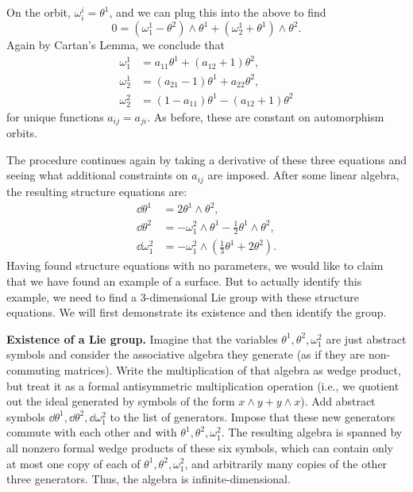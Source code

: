 On the orbit, $\omega^i_i=\theta^1$, and we can plug this into the above to find 
\[0=(\omega^1_1-\theta^2)\wedge\theta^1+(\omega^1_2+\theta^1)\wedge\theta^2.\]
Again by Cartan's Lemma, we conclude that 
\begin{align}
    \omega^1_1&=a_{11}\theta^1+(a_{12}+1)\theta^2,\\
    \omega^1_2&=(a_{21}-1)\theta^1+a_{22}\theta^2,\\
    \omega^2_2&=(1-a_{11})\theta^1-(a_{12}+1)\theta^2
\end{align}
for unique functions $a_{ij}=a_{ji}$. As before, these are constant on automorphism orbits.

The procedure continues again by taking a derivative of these three equations and seeing what additional constraints on $a_{ij}$ are imposed. After some linear algebra, the resulting structure equations are:
\begin{align}
    \dd\theta^1&=2\theta^1\wedge\theta^2,\\
    \dd\theta^2&=-\omega^2_1\wedge\theta^1-\frac12\theta^1\wedge\theta^2,\\
    \dd\omega^2_1&=-\omega^2_1\wedge\left(\frac13\theta^1+2\theta^2\right).
\end{align}
Having found structure equations with no parameters, we would like to claim that we have found an example of a surface. But to actually identify this example, we need to find a $3$-dimensional Lie group with these structure equations. We will first demonstrate its existence and then identify the group.

\textbf{Existence of a Lie group.} Imagine that the variables $\theta^1,\theta^2,\omega^2_1$ are just abstract symbols and consider the associative algebra they generate (as if they are non-commuting matrices). Write the multiplication of that algebra as wedge product, but treat it as a formal antisymmetric multiplication operation (i.e., we quotient out the ideal generated by symbols of the form $x\wedge y+y\wedge x$). Add abstract symbols $\dd\theta^1,\dd\theta^2,\dd\omega^2_1$ to the list of generators. Impose that these new generators commute with each other and with $\theta^1,\theta^2,\omega^2_1$. The resulting algebra is spanned by all nonzero formal wedge products of these six symbols, which can contain only at most one copy of each of $\theta^1,\theta^2,\omega^2_1$, and arbitrarily many copies of the other three generators. Thus, the algebra is infinite-dimensional.

